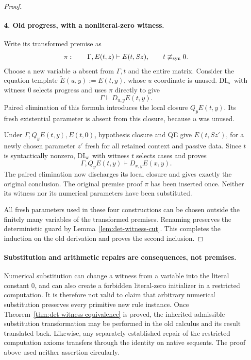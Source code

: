 \begin{proof}
\paragraph{4. Old progress, with a nonliteral-zero witness.}
Write its transformed premise as
\[
 \pi:\qquad\Gamma,E(t,z)\vdash E(t,Sz),
 \qquad t\not\equiv_{\rm syn}0.
\]
Choose a new variable $u$ absent from $\Gamma,t$ and the entire matrix.
Consider the equation template $\widetilde E(u,y):=E(t,y)$, whose
$u$ coordinate is unused.  DI$_{\rm w}$ with witness $0$ selects
progress and uses $\pi$ directly to give
\[
                    \Gamma\vdash D_{u,y}E(t,y).
\]
Paired elimination of this formula introduces the local closure
$Q_yE(t,y)$.  Its fresh existential parameter is absent from this
closure, because $u$ was unused.

Under $\Gamma,Q_yE(t,y),E(t,0)$, hypothesis closure and QE give
$E(t,Sz')$, for a newly chosen parameter $z'$ fresh for all retained
context and passive data.  Since $t$ is syntactically nonzero,
DI$_{\rm w}$ with witness $t$ selects cases and proves
\[
          \Gamma,Q_yE(t,y)\vdash D_{x,y}E(x,y).
\]
The paired elimination now discharges its local closure and gives
exactly the original conclusion.  The original premise proof $\pi$
has been inserted once.  Neither its witness nor its numerical
parameters have been substituted.

All fresh parameters used in these four constructions can be chosen
outside the finitely many variables of the transformed premises.
Renaming preserves the deterministic guard by
Lemma~\ref{lem:det-witness-cut}.  This completes the induction on the
old derivation and proves the second inclusion.
\end{proof}

\paragraph{Substitution and arithmetic repairs are consequences, not
premises.}
Numerical substitution can change a witness from a variable into the
literal constant $0$, and can also create a forbidden literal-zero
initializer in a restricted computation.  It is therefore not valid to
claim that arbitrary numerical substitution preserves every primitive
new rule instance.  Once Theorem~\ref{thm:det-witness-equivalence} is
proved, the inherited admissible substitution transformation may be
performed in the old calculus and its result translated back.  Likewise,
any separately established repair of the restricted computation axioms
transfers through the identity on native sequents.  The proof above used
neither assertion circularly.

